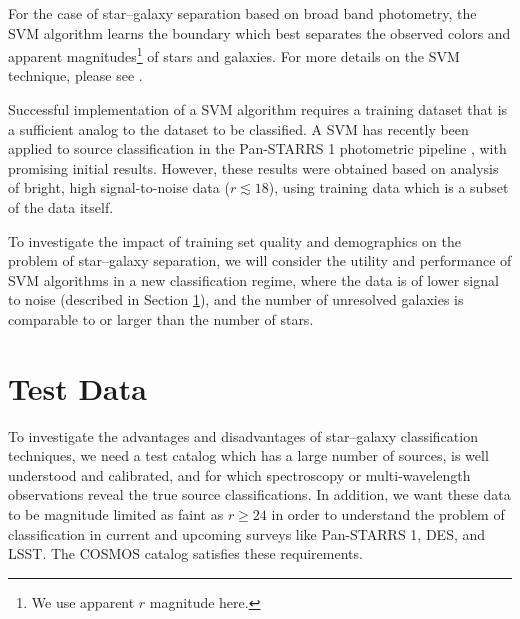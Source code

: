 \documentclass[12pt,preprint]{aastex}
\begin{document}
For the case of star--galaxy separation based on broad
band photometry, the SVM algorithm learns the boundary which best
separates the observed colors and apparent magnitudes\footnote{We use
  apparent $r$ magnitude here.} of stars and galaxies.  For more
details on the SVM technique, please see \citet{muller01}.

Successful implementation of a SVM algorithm requires a training dataset
that is a sufficient analog to the dataset to be classified.  A SVM has
recently been applied to source classification in the Pan-STARRS 1
photometric pipeline \citep{saglia12}, with promising initial
results. However, these results were obtained based on analysis of 
bright, high signal-to-noise data ($r\lesssim18$), using training data 
which is a subset of the data itself.

To investigate the impact of training set quality and demographics on
the problem of star--galaxy separation, we will consider the utility
and performance of SVM algorithms in a new classification regime,
where the data is of lower signal to noise (described in Section
\ref{sec:data}), and the number of unresolved galaxies is comparable
to or larger than the number of stars.


%
%

\section{Test Data}
\label{sec:data}

To investigate the advantages and disadvantages of star--galaxy
classification techniques, we need a test catalog which has a large
number of sources, is well understood and calibrated, and for
which spectroscopy or multi-wavelength observations reveal the true
source classifications.  In addition, we want these data to be
magnitude limited as faint as $r\ge24$ in order to understand the
problem of classification in current and upcoming surveys like
Pan-STARRS 1, DES, and LSST.  The COSMOS catalog satisfies these
requirements.   
\end{document}
